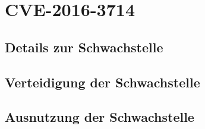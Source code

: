 \chapter{CVE-2016-3714}\label{ch:cve}

%
%
\section{Details zur Schwachstelle}\label{sec:details-zur-schwachstelle}




%
%
\section{Verteidigung der Schwachstelle}\label{sec:verteidigung-der-schwachstelle}




%
%
\section{Ausnutzung der Schwachstelle}\label{sec:ausnutzung-der-schwachstelle}













%
